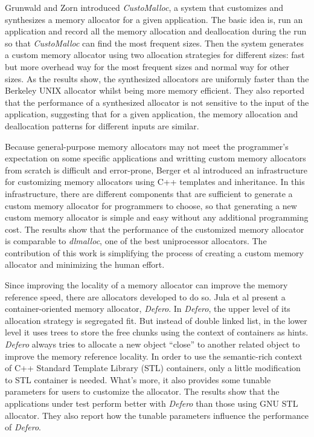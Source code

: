 \documentclass{acm_proc_article-sp}
\begin{document}
Grunwald and Zorn introduced \emph{CustoMalloc}, a system that customizes and synthesizes a memory allocator for a given application\cite{SPE:SPE4380230804}. The basic idea is, run an application and record all the memory allocation and deallocation during the run so that \emph{CustoMalloc} can find the most frequent sizes. Then the system generates a custom memory allocator using two allocation strategies for different sizes: fast but more overhead way for the most frequent sizes and normal way for other sizes. As the results show, the synthesized allocators are uniformly faster than the Berkeley UNIX allocator whilst being more memory efficient. They also reported that the performance of a synthesized allocator is not sensitive to the input of the application, suggesting that for a given application, the memory allocation and deallocation patterns for different inputs are similar. 

Because general-purpose memory allocators may not meet the programmer's expectation on some specific applications and writting custom memory allocators from scratch is difficult and error-prone, Berger et al\cite{Berger:2001:CHM:381694.378821} introduced an infrastructure for customizing memory allocators using C++ templates and inheritance. In this infrastructure, there are different components that are sufficient to generate a custom memory allocator for programmers to choose, so that generating a new custom memory allocator is simple and easy without any additional programming cost. The results show that the performance of the customized memory allocator is comparable to \emph{dlmalloc}, one of the best uniprocessor allocators. The contribution of this work is simplifying the process of creating a custom memory allocator and minimizing the human effort.

Since improving the locality of a memory allocator can improve the memory reference speed, there are allocators developed to do so. Jula et al\cite{Jula2007} present a container-oriented memory allocator, \emph{Defero}. In \emph{Defero}, the upper level of its allocation strategy is segregated fit. But instead of double linked list, in the lower level it uses trees to store the free chunks using the context of containers as hints. \emph{Defero} always tries to allocate a new object ``close'' to another related object to improve the memory reference locality. In order to use the semantic-rich context of C++ Standard Template Library (STL) containers, only a little modification to STL container is needed. What's more, it also provides some tunable parameters for users to customize the allocator. The results show that the applications under test perform better with \emph{Defero} than those using GNU STL allocator. They also report how the tunable parameters influence the performance of \emph{Defero}.
\end{document}
